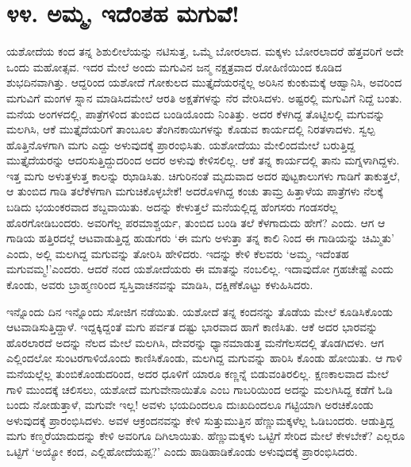 
\chapter{೪೪. ಅಮ್ಮ, ಇದೆಂತಹ ಮಗುವೆ!}

ಯಶೋದೆಯ ಕಂದ ತನ್ನ ಶಿಶುಲೀಲೆಯನ್ನು ನಟಿಸುತ್ತ, ಒಮ್ಮೆ ಬೋರಲಾದ. ಮಕ್ಕಳು ಬೋರಲಾದರೆ ಹೆತ್ತವರಿಗೆ ಅದೇ ಒಂದು ಮಹೋತ್ಸವ. ಇದರ ಮೇಲೆ ಅಂದು ಮಗುವಿನ ಜನ್ಮ ನಕ್ಷತ್ರವಾದ ರೋಹಿಣಿಯಿಂದ ಕೂಡಿದ ಶುಭದಿನವಾಗಿತ್ತು. ಆದ್ದರಿಂದ ಯಶೋದೆ ಗೋಕುಲದ ಮುತ್ತೈದೆಯರನ್ನೆಲ್ಲ ಅರಿಸಿನ ಕುಂಕುಮಕ್ಕೆ ಆಹ್ವಾನಿಸಿ, ಅವರಿಂದ ಮಗುವಿಗೆ ಮಂಗಳ ಸ್ನಾನ ಮಾಡಿಸಿದಮೇಲೆ ಆರತಿ ಅಕ್ಷತೆಗಳನ್ನು ನೆರ ವೇರಿಸಿದಳು. ಅಷ್ಟರಲ್ಲಿ ಮಗುವಿಗೆ ನಿದ್ದೆ ಬಂತು. ಮನೆಯ ಅಂಗಳದಲ್ಲಿ, ಪಾತ್ರೆಗಳಿಂದ ತುಂಬಿದ ಬಂಡಿಯೊಂದು ನಿಂತಿತ್ತು. ಅದರ ಕೆಳಗಿದ್ದ ತೊಟ್ಟಿಲಲ್ಲಿ ಮಗುವನ್ನು ಮಲಗಿಸಿ, ಆಕೆ ಮುತ್ತೈದೆಯರಿಗೆ ತಾಂಬೂಲ ತೆಂಗಿನಕಾಯಿಗಳನ್ನು ಕೊಡುವ ಕಾರ್ಯದಲ್ಲಿ ನಿರತಳಾದಳು. ಸ್ವಲ್ಪ ಹೊತ್ತಿನೊಳಗಾಗಿ ಮಗು ಎದ್ದು ಅಳುವುದಕ್ಕೆ ಪ್ರಾರಂಭಿಸಿತು. ಯಶೋದೆಯು ಮೇಲಿಂದಮೇಲೆ ಬರುತ್ತಿದ್ದ ಮುತ್ತೈದೆಯರನ್ನು ಆದರಿಸುತ್ತಿದ್ದುದರಿಂದ ಅದರ ಅಳುವು ಕೇಳಿಸಲಿಲ್ಲ. ಆಕೆ ತನ್ನ ಕಾರ್ಯದಲ್ಲಿ ತಾನು ಮಗ್ನಳಾಗಿದ್ದಳು. ಇತ್ತ ಮಗು ಅಳುತ್ತಳುತ್ತ ಕಾಲನ್ನು ಝಾಡಿಸಿತು. ಚಿಗುರಿನಂತೆ ಮೃದುವಾದ ಅದರ ಪುಟ್ಟಕಾಲುಗಳು ಗಾಡಿಗೆ ತಾಕುತ್ತಲೆ, ಆ ತುಂಬಿದ ಗಾಡಿ ತಲೆಕೆಳಗಾಗಿ ಮಗುಚಿಕೊಳ್ಳಬೇಕೆ! ಅದರೊಳಗಿದ್ದ ಕಂಚು ತಾಮ್ರ ಹಿತ್ತಾಳೆಯ ಪಾತ್ರೆಗಳು ನೆಲಕ್ಕೆ ಬಡಿದು ಭಯಂಕರವಾದ ಶಬ್ದವಾಯಿತು. ಅದನ್ನು ಕೇಳುತ್ತಲೆ ಮನೆಯಲ್ಲಿದ್ದ ಹೆಂಗಸರು ಗಂಡಸರೆಲ್ಲ ಹೊರಗೋಡಿಬಂದರು. ಅವರಿಗೆಲ್ಲ ಪರಮಾಶ್ಚರ್ಯ, ತುಂಬಿದ ಬಂಡಿ ತಲೆ ಕೆಳಗಾದುದು ಹೇಗೆ? ಎಂದು. ಆಗ ಆ ಗಾಡಿಯ ಹತ್ತಿರದಲ್ಲೆ ಆಟವಾಡುತ್ತಿದ್ದ ಹುಡುಗರು ‘ಈ ಮಗು ಅಳುತ್ತಾ ತನ್ನ ಕಾಲಿ ನಿಂದ ಈ ಗಾಡಿಯನ್ನು ಚಿಮ್ಮಿತು’ ಎಂದು, ಅಲ್ಲಿ ಮಲಗಿದ್ದ ಮಗುವನ್ನು ತೋರಿಸಿ ಹೇಳಿದರು. ಇದನ್ನು ಕೇಳಿ ಕೆಲವರು ‘ಅಮ್ಮ, ಇದೆಂತಹ ಮಗುವಮ್ಮ!’ಎಂದರು. ಆದರೆ ನಂದ ಯಶೋದೆಯರು ಈ ಮಾತನ್ನು ನಂಬಲಿಲ್ಲ. ಇದಾವುದೋ ಗ್ರಹಚೇಷ್ಟೆ ಎಂದು ಕೊಂಡು, ಅವರು ಬ್ರಾಹ್ಮಣರಿಂದ ಸ್ವಸ್ತಿವಾಚನವನ್ನು ಮಾಡಿಸಿ, ದಕ್ಷಿಣೆಕೊಟ್ಟು ಕಳುಹಿಸಿದರು.

ಇನ್ನೊಂದು ದಿನ ಇನ್ನೊಂದು ಸೋಜಿಗ ನಡೆಯಿತು. ಯಶೋದೆ ತನ್ನ ಕಂದನನ್ನು ತೊಡೆಯ ಮೇಲೆ ಕೂಡಿಸಿಕೊಂಡು ಆಟವಾಡಿಸುತ್ತಿದ್ದಾಳೆ. ಇದ್ದಕ್ಕಿದ್ದಂತೆ ಮಗು ಪರ್ವತ ದಷ್ಟು ಭಾರವಾದ ಹಾಗೆ ಕಾಣಿಸಿತು. ಆಕೆ ಅದರ ಭಾರವನ್ನು ಹೊರಲಾರದೆ ಅದನ್ನು ನೆಲದ ಮೇಲೆ ಮಲಗಿಸಿ, ದೇವರನ್ನು ಧ್ಯಾನಮಾಡುತ್ತ ಮನೆಗೆಲಸದಲ್ಲಿ ತೊಡಗಿದಳು. ಆಗ ಎಲ್ಲಿಂದಲೋ ಸುಂಟರಗಾಳಿಯೊಂದು ಕಾಣಿಸಿಕೊಂಡು, ಮಲಗಿದ್ದ ಮಗುವನ್ನು ಹಾರಿಸಿ ಕೊಂಡು ಹೋಯಿತು. ಆ ಗಾಳಿ ಮನೆಯಲ್ಲೆಲ್ಲ ತುಂಬಿಕೊಂಡುದರಿಂದ, ಅದರ ಧೂಳಿಗೆ ಯಾರೂ ಕಣ್ಣನ್ನೆ ಬಿಡುವಂತಿರಲಿಲ್ಲ. ಕ್ಷಣಕಾಲವಾದ ಮೇಲೆ ಗಾಳಿ ಮುಂದಕ್ಕೆ ಚಲಿಸಲು, ಯಶೋದೆ ಮಗುವೇನಾಯಿತೊ ಎಂಬ ಗಾಬರಿಯಿಂದ ಅದನ್ನು ಮಲಗಿಸಿದ್ದ ಕಡೆಗೆ ಓಡಿ ಬಂದು ನೋಡುತ್ತಾಳೆ, ಮಗುವೇ ಇಲ್ಲ! ಅವಳು ಭಯದಿಂದಲೂ ದುಃಖದಿಂದಲೂ ಗಟ್ಟಿಯಾಗಿ ಅರಚಿಕೊಂಡು ಅಳುವುದಕ್ಕೆ ಪ್ರಾರಂಭಿಸಿದಳು. ಅವಳ ಆಕ್ರಂದನವನ್ನು ಕೇಳಿ ಸುತ್ತುಮುತ್ತಿನ ಹೆಣ್ಣುಮಕ್ಕಳೆಲ್ಲ ಓಡಿಬಂದರು. ಆಡುತ್ತಿದ್ದ ಮಗು ಕಣ್ಮರೆಯಾದುದನ್ನು ಕೇಳಿ ಅವರಿಗೂ ದಿಗಿಲಾಯಿತು. ಹೆಣ್ಣುಮಕ್ಕಳು ಒಟ್ಟಿಗೆ ಸೇರಿದ ಮೇಲೆ ಕೇಳಬೇಕೆ? ಎಲ್ಲರೂ ಒಟ್ಟಿಗೆ ‘ಅಯ್ಯೋ ಕಂದ, ಎಲ್ಲಿಹೋದೆಯಪ್ಪ?’ ಎಂದು ಹಾಡಿಹಾಡಿಕೊಂಡು ಅಳುವುದಕ್ಕೆ ಪ್ರಾರಂಭಿಸಿದರು.

